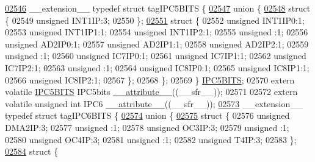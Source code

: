 \begin{DoxyCode}
\hypertarget{a00015_source_l02546}{}\hyperlink{a00014}{02546} \_\_extension\_\_ \textcolor{keyword}{typedef} \textcolor{keyword}{struct }tagIPC5BITS \{
\hypertarget{a00015_source_l02547}{}\hyperlink{a00015}{02547}   \textcolor{keyword}{union }\{
\hypertarget{a00015_source_l02548}{}\hyperlink{a00015}{02548}     \textcolor{keyword}{struct }\{
02549       \textcolor{keywordtype}{unsigned} INT1IP:3;
02550     \};
\hypertarget{a00015_source_l02551}{}\hyperlink{a00015}{02551}     \textcolor{keyword}{struct }\{
02552       \textcolor{keywordtype}{unsigned} INT1IP0:1;
02553       \textcolor{keywordtype}{unsigned} INT1IP1:1;
02554       \textcolor{keywordtype}{unsigned} INT1IP2:1;
02555       \textcolor{keywordtype}{unsigned} :1;
02556       \textcolor{keywordtype}{unsigned} AD2IP0:1;
02557       \textcolor{keywordtype}{unsigned} AD2IP1:1;
02558       \textcolor{keywordtype}{unsigned} AD2IP2:1;
02559       \textcolor{keywordtype}{unsigned} :1;
02560       \textcolor{keywordtype}{unsigned} IC7IP0:1;
02561       \textcolor{keywordtype}{unsigned} IC7IP1:1;
02562       \textcolor{keywordtype}{unsigned} IC7IP2:1;
02563       \textcolor{keywordtype}{unsigned} :1;
02564       \textcolor{keywordtype}{unsigned} IC8IP0:1;
02565       \textcolor{keywordtype}{unsigned} IC8IP1:1;
02566       \textcolor{keywordtype}{unsigned} IC8IP2:1;
02567     \};
02568   \};
02569 \} \hyperlink{a00014_dc/dea/a00558}{IPC5BITS};
02570 \textcolor{keyword}{extern} \textcolor{keyword}{volatile} \hyperlink{a00014_dc/dea/a00558}{IPC5BITS} IPC5bits \hyperlink{a00015_a493c46f03454991ccc5aa7a6e1dfb2a7}{\_\_attribute\_\_}((\_\_sfr\_\_));
02571 
02572 \textcolor{keyword}{extern} \textcolor{keyword}{volatile} \textcolor{keywordtype}{unsigned} \textcolor{keywordtype}{int}  IPC6 \hyperlink{a00015_a493c46f03454991ccc5aa7a6e1dfb2a7}{\_\_attribute\_\_}((\_\_sfr\_\_));
\hypertarget{a00015_source_l02573}{}\hyperlink{a00014}{02573} \_\_extension\_\_ \textcolor{keyword}{typedef} \textcolor{keyword}{struct }tagIPC6BITS \{
\hypertarget{a00015_source_l02574}{}\hyperlink{a00015}{02574}   \textcolor{keyword}{union }\{
\hypertarget{a00015_source_l02575}{}\hyperlink{a00015}{02575}     \textcolor{keyword}{struct }\{
02576       \textcolor{keywordtype}{unsigned} DMA2IP:3;
02577       \textcolor{keywordtype}{unsigned} :1;
02578       \textcolor{keywordtype}{unsigned} OC3IP:3;
02579       \textcolor{keywordtype}{unsigned} :1;
02580       \textcolor{keywordtype}{unsigned} OC4IP:3;
02581       \textcolor{keywordtype}{unsigned} :1;
02582       \textcolor{keywordtype}{unsigned} T4IP:3;
02583     \};
\hypertarget{a00015_source_l02584}{}\hyperlink{a00015}{02584}     \textcolor{keyword}{struct }\{

\end{DoxyCode}
